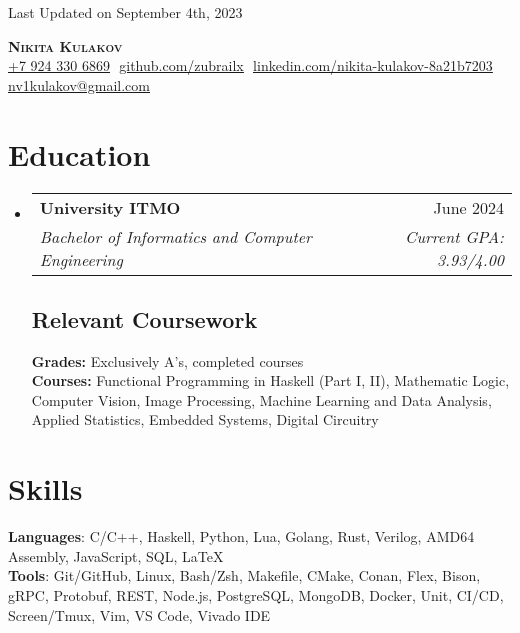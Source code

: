 \documentclass[letterpaper,11pt]{article}
\makeatletter
\newcommand{\resumeSubheading}[4]{
  \vspace{-2pt}\item
    \begin{tabular*}{0.97\textwidth}[t]{l@{\extracolsep{\fill}}r}
      \textbf{#1} & #2 \\
      \textit{\small#3} & \textit{\small #4} \\
    \end{tabular*}\vspace{-7pt}
}
\newcommand{\resumeSubHeadingListStart}{\begin{itemize}[leftmargin=0.15in, label={}]}
\newcommand{\resumeSubHeadingListEnd}{\end{itemize}}
\makeatother
\begin{document}
\begin{flushright}
  \vspace{-4pt}
  \color{gray}
  \item
  Last Updated on September 4th, 2023
\end{flushright}

\vspace{-7pt}

\begin{center}
    \textbf{\huge \scshape Nikita Kulakov} \\ \vspace{8pt}
    \small 
    \href{tel:79243306869}{\underline{+7 924 330 6869}} $  $
    \href{https://github.com/zubrailx}{\underline{github.com/zubrailx}} $  $
    \href{https://www.linkedin.com/in/nikita-kulakov-8a21b7203/}{\underline{linkedin.com/nikita-kulakov-8a21b7203}} $  $
    \href{mailto:nv1kulakov@gmail.com}
    {\underline{nv1kulakov@gmail.com}}
\end{center}

\section{Education}
  \resumeSubHeadingListStart
  
    \resumeSubheading
      {University ITMO}{June 2024}
      {Bachelor of Informatics and Computer Engineering}{Current GPA: 3.93/4.00}
      
    \subsection{Relevant Coursework}
      \textbf{Grades:} Exclusively A's, completed courses\\
      \textbf{Courses:} Functional Programming in Haskell (Part I, II), Mathematic Logic, Computer Vision, Image Processing, Machine Learning and Data Analysis, Applied Statistics, Embedded Systems, Digital Circuitry\\

  \resumeSubHeadingListEnd

\section{Skills}
 \begin{itemize}[leftmargin=0.15in, label={}]
    \small{\item{
    
     \textbf{Languages}{: C/C++, Haskell, Python, Lua, Golang, Rust, Verilog, AMD64 Assembly, JavaScript, SQL, \LaTeX} \\
     
     \textbf{Tools}{: Git/GitHub, Linux, Bash/Zsh, Makefile, CMake, Conan, Flex, Bison, gRPC, Protobuf, REST, Node.js, PostgreSQL, MongoDB, Docker, Unit, CI/CD, Screen/Tmux, Vim, VS Code, Vivado IDE}
    }}
 \end{itemize}
\end{document}
